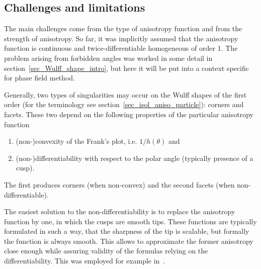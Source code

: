 	\subsection{Challenges and limitations}
	The main challenges come from the type of anisotropy function and from the strength of anisotropy. So far, it was implicitly assumed that the anisotropy function is continuous and twice-differentiable homogeneous of order 1. The problem arising from forbidden angles was worked in some detail in section~\ref{sec_Wulff_shape_intro}, but here it will be put into a context specific for phase field method.
	
	Generally, two types of singularities may occur on the Wulff shapes of the first order (for the terminology see section~\ref{sec_isol_aniso_particle}): corners and facets. These two depend on the following properties of the particular anisotropy function
	\begin{enumerate}
		\item (non-)convexity of the Frank's plot, i.e. $1/h(\theta)$ and
		\item (non-)differentiability with respect to the polar angle (typically presence of a cusp).
	\end{enumerate}
	The first produces corners (when non-convex) and the second facets (when non-differentiable). 
	
	The easiest solution to the non-differentiability is to replace the anisotropy function by one, in which the cusps are smooth tips. These functions are typically formulated in such a way, that the sharpness of the tip is scalable, but formally the function is always smooth. This allows to approximate the former anisotropy close enough while assuring validity of the formulas relying on the differentiability. This was employed for example in~\cite{Debierre2003,Loginova2004,Miura2013}.
	
